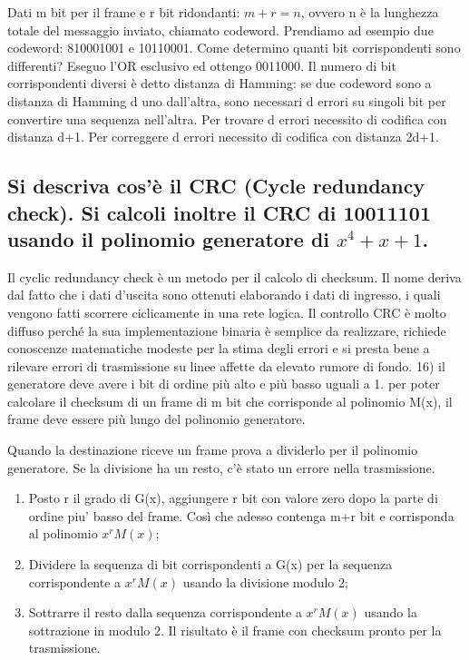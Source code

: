 Dati m bit per il frame e r bit ridondanti: $m+r=n$, ovvero n è la lunghezza totale del messaggio
inviato, chiamato codeword. Prendiamo ad esempio due codeword: 810001001 e 10110001. Come determino quanti bit corrispondenti sono differenti? Eseguo l’OR esclusivo ed ottengo 0011000. Il numero di bit corrispondenti diversi è detto distanza di Hamming: se due codeword sono a distanza di Hamming d uno dall’altra, sono necessari d errori su singoli bit per convertire una sequenza nell’altra. Per trovare d errori necessito di codifica con distanza d+1. 
Per correggere d errori necessito di codifica con distanza 2d+1.

\subsection{Si descriva cos'è il CRC (Cycle redundancy check). Si calcoli inoltre il CRC di 10011101 usando il polinomio generatore di $x^4+x+1$.}

Il cyclic redundancy check è un metodo per il calcolo di checksum. Il nome deriva dal fatto che i dati d'uscita sono ottenuti elaborando i dati di ingresso, i quali vengono fatti scorrere ciclicamente in una rete logica. Il controllo CRC è molto diffuso perché la sua implementazione binaria è semplice da realizzare, richiede conoscenze matematiche modeste per la stima degli errori e si presta bene a rilevare errori di trasmissione su linee affette da elevato rumore di fondo. 16) il generatore deve avere i bit di ordine più alto e più basso uguali a 1. per poter calcolare il checksum di un frame di m bit che corrisponde al polinomio M(x), il frame deve essere più lungo del polinomio generatore.

Quando la destinazione riceve un frame prova a dividerlo per il polinomio generatore. Se la
divisione ha un resto, c'è stato un errore nella trasmissione.

\begin{enumerate}

\item Posto r il grado di G(x), aggiungere r bit con valore zero dopo la parte di ordine piu'
basso del frame. Così che adesso contenga m+r bit e corrisponda al polinomio $x^r M(x)$;
\item Dividere la sequenza di bit corrispondenti a G(x) per la sequenza corrispondente a $x^r
M(x)$ usando la divisione modulo 2;
\item Sottrarre il resto dalla sequenza corrispondente a $x^r M(x)$ usando la sottrazione in
modulo 2. Il risultato è il frame con checksum pronto per la trasmissione.

\end{enumerate}


